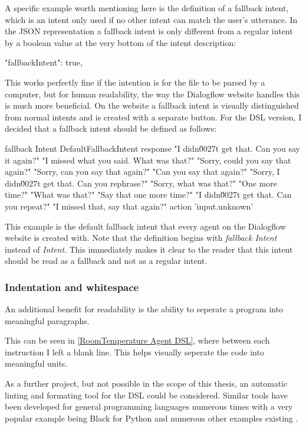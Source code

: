 A specific example worth mentioning here is the definition of a fallback intent, which is an intent only used if no other intent can match the user's utterance.
In the JSON representation a fallback intent is only different from a regular intent by a boolean value at the very bottom of the intent description:
\begin{JSON}
    "fallbackIntent": true,
\end{JSON}
This works perfectly fine if the intention is for the file to be parsed by a computer, but for human readability, the way the Dialogflow website handles this is much more beneficial.
On the website a fallback intent is visually distinguished from normal intents and is created with a separate button.
For the DSL version, I decided that a fallback intent should be defined as follows:
\begin{DSL}
    fallback Intent DefaultFallbackIntent
        response 
            "I didn\u0027t get that. Can you say it again?"
            "I missed what you said. What was that?"
            "Sorry, could you say that again?"
            "Sorry, can you say that again?"
            "Can you say that again?"
            "Sorry, I didn\u0027t get that. Can you rephrase?"
            "Sorry, what was that?"
            "One more time?"
            "What was that?"
            "Say that one more time?"
            "I didn\u0027t get that. Can you repeat?"
            "I missed that, say that again?"
        action 'input.unknown'
\end{DSL}
This example is the default fallback intent that every agent on the Dialogflow website is created with. Note that the definition begins with \textit{fallback Intent} instead of \textit{Intent}. This immediately makes it clear to the reader that this intent should be read as a fallback and not as a regular intent.

\subsubsection{Indentation and whitespace}

An additional benefit for readability is the ability to seperate a program into meaningful paragraphs.

This can be seen in \autoref{RoomTemperature Agent DSL}, where between each instruction I left a blank line. This helps visually seperate the code into meaningful units.

As a further project, but not possible in the scope of this thesis, an automatic linting and formating tool for the DSL could be considered. Similar tools have been developed for general programming languages numerous times with a very popular example being Black for Python \cite{Python} and numerous other examples existing \cite{Github}.

